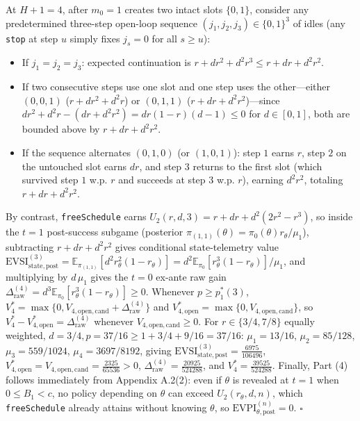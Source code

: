 \documentclass[11pt,letterpaper]{article}
\providecommand{\tightlist}{\setlength{\itemsep}{2pt}\setlength{\parskip}{0pt}}
\begin{document}
At \(H+1 = 4\), after \(m_0 = 1\) creates two intact slots \(\{0, 1\}\),
consider any predetermined three-step open-loop sequence
\((j_1, j_2, j_3) \in \{0, 1\}^3\) of idles (any \texttt{stop} at step
\(u\) simply fixes \(j_s = 0\) for all \(s \ge u\)):

\begin{itemize}
\tightlist
\item
  If \(j_1 = j_2 = j_3\): expected continuation is
  \(r + d r^2 + d^2 r^3 \le r + d r + d^2 r^2\).
\item
  If two consecutive steps use one slot and one step uses the
  other---either \((0,0,1)\) (\(r + d r^2 + d^2 r\)) or \((0,1,1)\)
  (\(r + d r + d^2 r^2\))---since
  \(d r^2 + d^2 r - (d r + d^2 r^2) = d r(1-r)(d - 1) \le 0\) for
  \(d \in [0,1]\), both are bounded above by \(r + d r + d^2 r^2\).
\item
  If the sequence alternates \((0, 1, 0)\) (or \((1, 0, 1)\)): step
  \(1\) earns \(r\), step \(2\) on the untouched slot earns \(d r\), and
  step \(3\) returns to the first slot (which survived step \(1\) w.p.
  \(r\) and succeeds at step \(3\) w.p. \(r\)), earning \(d^2 r^2\),
  totaling \(r + d r + d^2 r^2\).
\end{itemize}

By contrast, \texttt{freeSchedule} earns
\(U_2(r, d, 3) = r + d r + d^2(2r^2 - r^3)\), so inside the \(t = 1\)
post-success subgame (posterior
\(\pi_{(1,1)}(\theta) = \pi_0(\theta)r_\theta/\mu_1\)), subtracting
\(r + dr + d^2 r^2\) gives conditional state-telemetry value
\(\mathrm{EVSI}_{\mathrm{state,post}}^{(3)} = \mathbb{E}_{\pi_{(1,1)}}[d^2 r_\theta^2(1 - r_\theta)] = d^2\mathbb{E}_{\pi_0}[r_\theta^3(1 - r_\theta)]/\mu_1\),
and multiplying by \(d\,\mu_1\) gives the \(t = 0\) ex-ante raw gain
\(\Delta_{\mathrm{raw}}^{(4)} = d^3 \mathbb{E}_{\pi_0}[r_\theta^3(1 - r_\theta)] \ge 0\).
Whenever \(p \ge p_1^*(3)\),
\(V_4^* = \max\{0, V_{4,\mathrm{open,cand}} + \Delta_{\mathrm{raw}}^{(4)}\}\)
and \(V_{4,\mathrm{open}}^* = \max\{0, V_{4,\mathrm{open,cand}}\}\), so
\(V_4^* - V_{4,\mathrm{open}}^* = \Delta_{\mathrm{raw}}^{(4)}\) whenever
\(V_{4,\mathrm{open,cand}} \ge 0\). For \(r \in \{3/4, 7/8\}\) equally
weighted, \(d = 3/4, p = 37/16 \ge 1 + 3/4 + 9/16 = 37/16\):
\(\mu_1 = 13/16\), \(\mu_2 = 85/128\), \(\mu_3 = 559/1024\),
\(\mu_4 = 3697/8192\), giving
\(\mathrm{EVSI}_{\mathrm{state,post}}^{(3)} = \frac{6975}{106496}\),
\(V_{4,\mathrm{open}}^* = V_{4,\mathrm{open,cand}} = \frac{2325}{65536} > 0\),
\(\Delta_{\mathrm{raw}}^{(4)} = \frac{20925}{524288}\), and
\(V_4^* = \frac{39525}{524288}\). Finally, Part (4) follows immediately
from Appendix A.2(2): even if \(\theta\) is revealed at \(t = 1\) when
\(0 \le B_1 < c\), no policy depending on \(\theta\) can exceed
\(U_2(r_\theta, d, n)\), which \texttt{freeSchedule} already attains
without knowing \(\theta\), so
\(\mathrm{EVPI}_{\theta,\mathrm{post}}^{(n)} = 0\). \(\square\)
\end{document}
